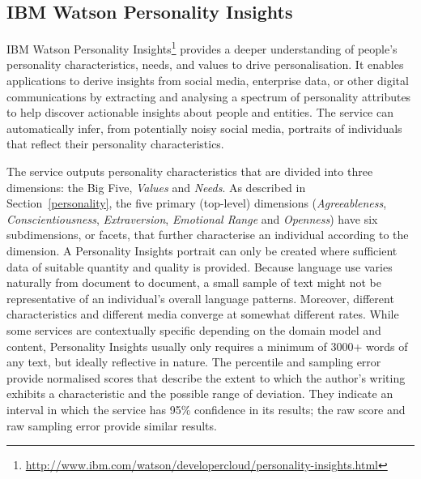 \documentclass[graybox]{svmult}
\begin{document}
\subsection{IBM Watson Personality Insights}

IBM Watson Personality
Insights\footnote{\url{http://www.ibm.com/watson/developercloud/personality-insights.html}}
provides a deeper understanding of people's personality
characteristics, needs, and values to drive personalisation. It
enables applications to derive insights from social media, enterprise
data, or other digital communications by extracting and analysing a
spectrum of personality attributes to help discover actionable
insights about people and entities. The service can automatically
infer, from potentially noisy social media, portraits of individuals
that reflect their personality characteristics.

The service outputs personality characteristics that are divided into
three dimensions: the Big Five, {\emph{Values}} and {\emph{Needs}}. As
described in Section~\ref{personality}, the five primary (top-level)
dimensions ({\emph{Agreeableness}}, {\emph{Conscientiousness}},
{\emph{Extraversion}}, {\emph{Emotional Range}} and {\emph{Openness}})
have six subdimensions, or facets, that further characterise an
individual according to the dimension. A Personality Insights portrait
can only be created where sufficient data of suitable quantity and
quality is provided. Because language use varies naturally from
document to document, a small sample of text might not be
representative of an individual's overall language patterns. Moreover,
different characteristics and different media converge at somewhat
different rates. While some services are contextually specific
depending on the domain model and content, Personality Insights
usually only requires a minimum of 3000+ words of any text, but
ideally reflective in nature. The percentile and sampling error
provide normalised scores that describe the extent to which the
author's writing exhibits a characteristic and the possible range of
deviation. They indicate an interval in which the service has 95\%
confidence in its results; the raw score and raw sampling error
provide similar results.

\end{document}
